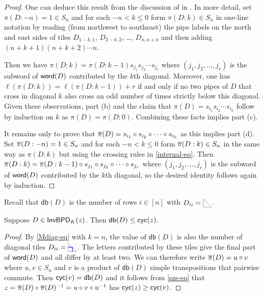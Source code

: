 \documentclass[10pt]{article}
\begin{document}
\begin{proof}
One can deduce this result from the 
discussion of
  in \cite[\S2.3]{Weigandt}.
In more detail, set $\pi(D : -n)=1\in S_n$ and for each $-n<k\leq 0$ form $\pi(D:k) \in S_n$ in one-line notation
 by reading (from northwest to southeast)  the pipe labels on the north and east sides of tiles $D_{1-k,1}$, $D_{2-k,2}$, \dots, $D_{n,n+k}$ and then adding $(n+k+1)(n+k+2)\cdots n$.

Then we have
 $\pi(D:k) = \pi(D:k-1) s_{j_1}s_{j_2}\cdots s_{j_r}$
 where $(j_1,j_2,\dots,j_r)$ is the  subword of $\mathsf{word}(D)$ contributed by the $k$th diagonal.
 Moreover, one has $\ell(\pi(D:k)) = \ell(\pi(D:k-1)) + r$ 
 if and only if no two pipes of $D$ that cross in diagonal $k$
 also cross an odd number of times strictly below this diagonal.
Given these observations, part (b) and
the claim that $\pi(D) = s_{i_1} s_{i_2}\cdots s_{i_k}$
follow by induction on $k$ as $\pi(D) = \pi(D:0)$.
 Combining these facts implies part (c).
 
It remains only to prove that $\overline{\pi}(D) = s_{i_1} \circ s_{i_2}\circ \cdots \circ s_{i_k}$ as this implies part (d).
Set $\overline{\pi}(D : -n)=1\in S_n$ and for each $-n<k\leq 0$ form $\overline{\pi}(D:k) \in S_n$ in the same way as $\pi(D:k)$
but 
using the crossing rules in \eqref{internal-eq}.
Then   $\overline{\pi}(D:k) = \overline{\pi}(D:k-1) \circ s_{j_1}\circ s_{j_2}\circ \cdots \circ s_{j_r}$
 where $(j_1,j_2,\dots,j_r)$ is the  subword of $\mathsf{word}(D)$ contributed by the $k$th diagonal, so the desired identity follows again by induction.
 \end{proof}
 
 Recall that $\mathsf{db}(D)$ is the number of rows $i \in [n]$
 with $D_{ii} =\BDIAG$.
 
 \begin{corollary}\label{db-cor}
 Suppose $D \in \mathsf{InvBPD}_K(z)$. Then $\mathsf{db}(D) \leq \textsf{cyc}(z)$.
 \end{corollary}
 
 \begin{proof}
 By \eqref{Mdiag-eq} with $k=n$,
 the value of $\mathsf{db}(D)$ is also the number of diagonal tiles $D_{ii} = \PDIAG$. The letters contributed by these tiles give
  the final part of $\mathsf{word}(D)$ and all differ by at least two. We can therefore write $\overline{\pi}(D) = u\circ v$ where $u,v\in S_n$ and $v$ is a product of $\mathsf{db}(D)$ simple transpositions that pairwise commute.
  Then $\textsf{cyc}(v) = \mathsf{db}(D)$ and it follows from \eqref{szs-eq}
  that $z=\overline{\pi}(D)\circ \overline{\pi}(D)^{-1} = u\circ v\circ u^{-1}$ has $\textsf{cyc}(z) \geq \textsf{cyc}(v)$.
 \end{proof}
 
\end{document}
